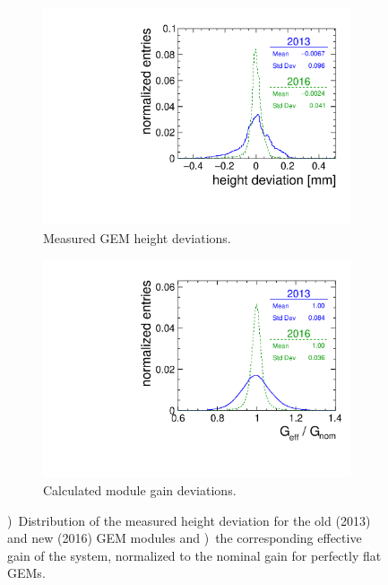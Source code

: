 \begin{figure}
\begin{subfigure}[b]{0.5\textwidth}
\includegraphics[width=\textwidth]{Tracker/TPC_Bonn/plots/TPC-DG_GEMHeightDistAll2013_2016comb_intnorm.pdf}
\caption{Measured GEM height deviations.}
\label{sfig:GEMheight}
\end{subfigure}%
\begin{subfigure}[b]{0.5\textwidth}
\includegraphics[width=\textwidth]{Tracker/TPC_Bonn/plots/TPC-DG_effectiveGainDistributionAll2013_2016comb_intnorm.pdf}
\caption{Calculated module gain deviations.}
\label{sfig:GEMeffGain}
\end{subfigure}
\caption{\protect{})~Distribution of the measured height deviation for the old (2013) and new (2016) GEM modules and \protect{})~the corresponding effective gain of the system, normalized to the nominal gain for perfectly flat GEMs.}
\label{fig:GEMheight}
\end{figure}

